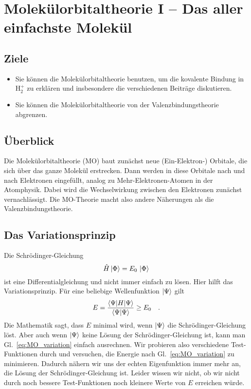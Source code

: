 \renewcommand{\chapterauthors}{Markus Lippitz}
\renewcommand{\lastmod}{28. Oktober 2021}

\chapter{Molekülorbitaltheorie I -- Das aller einfachste Molekül}




\section{Ziele}

\begin{itemize}
\item Sie können die Molekülorbitaltheorie benutzen, um die kovalente Bindung in H$_2^+$ zu erklären und insbesondere die verschiedenen Beiträge  diskutieren.

\item Sie können die Molekülorbitaltheorie von der Valenzbindungstheorie abgrenzen.


\end{itemize}

\section{Überblick}

Die Molekülorbitaltheorie  (MO) baut zunächst neue (Ein-Elektron-) Orbitale, die sich über das ganze Molekül erstrecken. Dann werden in diese Orbitale nach und nach Elektronen eingefüllt, analog zu Mehr-Elektronen-Atomen in der Atomphysik. Dabei wird die Wechselwirkung zwischen den Elektronen zunächst vernachlässigt. Die MO-Theorie macht also andere Näherungen als die Valenzbindungstheorie.

 
 
\section{Das Variationsprinzip}

 
Die Schrödinger-Gleichung
\begin{equation}
 \hat{H} \ket{\Phi} = E_0 \, \ket{\Phi} 
\end{equation}
ist eine Differentialgleichung und nicht immer einfach zu lösen. Hier hilft das Variationsprinzip. Für eine beliebige Wellenfunktion  $\ket{\Psi}$ gilt
\begin{equation}
 E = \frac{\braket{\Psi | H | \Psi}} {\braket{\Psi | \Psi}} \ge E_0 \quad .
 \label{eq:MO_variation}
\end{equation}
Die Mathematik sagt, dass $E$ minimal wird, wenn  $\ket{\Psi}$ die Schrödinger-Gleichung löst. Aber auch wenn $\ket{\Psi}$ keine Lösung der Schrödinger-Gleichung  ist, kann man Gl.~\ref{eq:MO_variation} einfach ausrechnen. Wir probieren  also verschiedene Test-Funktionen durch und versuchen, die Energie nach Gl.~\ref{eq:MO_variation} zu minimieren. Dadurch nähern wir uns der echten Eigenfunktion immer mehr an, die Lösung der Schrödinger-Gleichung ist. Leider wissen wir nicht, ob wir  nicht durch noch bessere Test-Funktionen noch kleinere Werte von $E$ erreichen würde.


